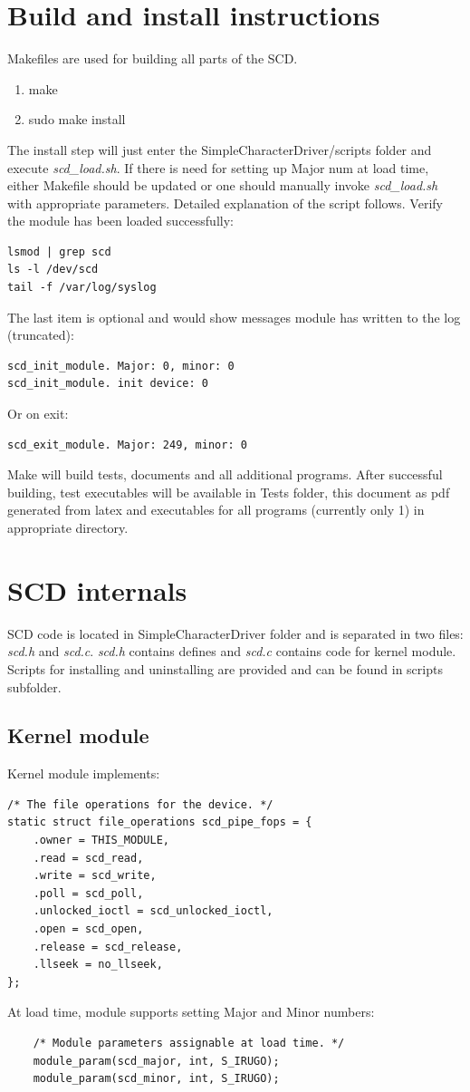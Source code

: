 \documentclass[11pt]{report}
\begin{document}
\section{Build and install instructions}
Makefiles are used for building all parts of the SCD.
\begin{enumerate}
\item make
\item sudo make install
\end{enumerate}
The install step will just enter the SimpleCharacterDriver/scripts folder and execute \emph{scd\_load.sh}. If there is need for setting up Major num at load time, either Makefile should be updated or one should manually invoke \emph{scd\_load.sh} with appropriate parameters. Detailed explanation of the script follows.
Verify the module has been loaded successfully:
\begin{verbatim}
lsmod | grep scd
ls -l /dev/scd
tail -f /var/log/syslog
\end{verbatim}
The last item is optional and would show messages module has written to the log (truncated):
\begin{verbatim}
scd_init_module. Major: 0, minor: 0
scd_init_module. init device: 0
\end{verbatim}
Or on exit:
\begin{verbatim}
scd_exit_module. Major: 249, minor: 0
\end{verbatim}

Make will build tests, documents and all additional programs. After successful building, test executables will be available in Tests folder, this document as pdf generated from latex and executables for all programs (currently only 1) in appropriate directory.

\section{SCD internals}
SCD code is located in SimpleCharacterDriver folder and is separated in two files: \emph{scd.h} and \emph{scd.c}. \emph{scd.h} contains defines and \emph{scd.c} contains code for kernel module. Scripts for installing and uninstalling are provided and can be found in scripts subfolder.
\subsection{Kernel module}
Kernel module implements:
\begin{verbatim}
/* The file operations for the device. */
static struct file_operations scd_pipe_fops = {
	.owner = THIS_MODULE,
	.read = scd_read,
	.write = scd_write,
	.poll = scd_poll,
	.unlocked_ioctl = scd_unlocked_ioctl,
	.open = scd_open,
	.release = scd_release,
	.llseek = no_llseek,
};
\end{verbatim}
At load time, module supports setting Major and Minor numbers:
\begin{verbatim}
	/* Module parameters assignable at load time. */
	module_param(scd_major, int, S_IRUGO);
	module_param(scd_minor, int, S_IRUGO);
\end{verbatim}
\end{document}

